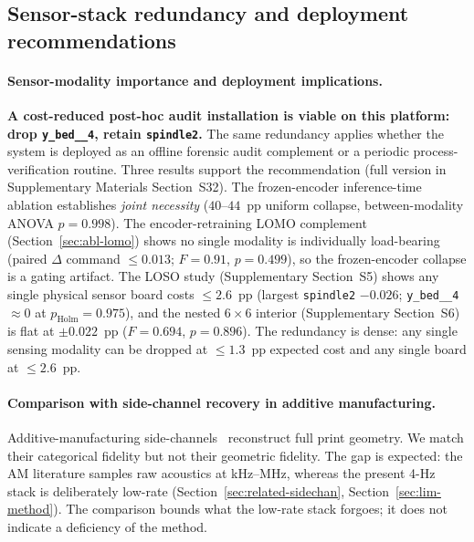 \documentclass[sensors,article,submit,moreauthors,pdftex]{Definitions/mdpi}
\begin{document}
\subsection{Sensor-stack redundancy and deployment recommendations}
\label{sec:disc-deployment-stack}

\paragraph{Sensor-modality importance and deployment implications.}\label{sec:disc-modality}\hspace*{0pt plus 1fill}

\textbf{A cost-reduced post-hoc audit installation is viable on this platform: drop \texttt{y\_bed\_\_4}, retain \texttt{spindle2}.} The same redundancy applies whether the system is deployed as an offline forensic audit complement or a periodic process-verification routine. Three results support the recommendation (full version in Supplementary Materials Section~S32). The frozen-encoder inference-time ablation establishes \emph{joint necessity} ($40$--$44$~pp uniform collapse, between-modality ANOVA $p\!=\!0.998$). The encoder-retraining LOMO complement (Section~\ref{sec:abl-lomo}) shows no single modality is individually load-bearing (paired $\Delta$ command $\le\!0.013$; $F\!=\!0.91$, $p\!=\!0.499$), so the frozen-encoder collapse is a gating artifact. The LOSO study (Supplementary Section~S5) shows any single physical sensor board costs $\le\!2.6$~pp (largest \texttt{spindle2} $-0.026$; \texttt{y\_bed\_\_4} $\approx\!0$ at $p_{\text{Holm}}\!=\!0.975$), and the nested $6\!\times\!6$ interior (Supplementary Section~S6) is flat at $\pm0.022$~pp ($F\!=\!0.694$, $p\!=\!0.896$). The redundancy is dense: any single sensing modality can be dropped at $\le\!1.3$~pp expected cost and any single board at $\le\!2.6$~pp.

\paragraph{Comparison with side-channel recovery in additive manufacturing.}\label{sec:disc-comparison-am}\hspace*{0pt plus 1fill}

Additive-manufacturing side-channels~\cite{alfaruque2016acoustic,song2016my,chhetri2016kcad,jamarani2024screg,chattopadhyay2025video} reconstruct full print geometry. We match their categorical fidelity but not their geometric fidelity. The gap is expected: the AM literature samples raw acoustics at kHz--MHz, whereas the present 4-Hz stack is deliberately low-rate (Section~\ref{sec:related-sidechan}, Section~\ref{sec:lim-method}). The comparison bounds what the low-rate stack forgoes; it does not indicate a deficiency of the method.
\end{document}
